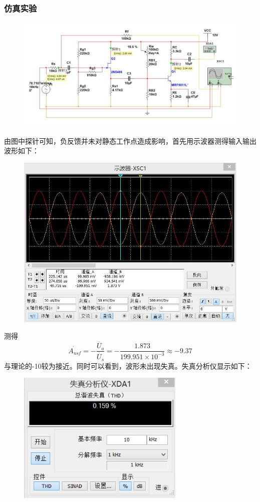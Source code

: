 \documentclass[12pt,a4paper]{article}
\begin{document}
\begin{spacing}{1.3}
\subsubsection{仿真实验}
\begin{figure}[H]
\centering
\includegraphics[width=\textwidth]{2.jpg}
\end{figure}
由图中探针可知，负反馈并未对静态工作点造成影响，首先用示波器测得输入输出波形如下：
\begin{figure}[H]
\centering
\includegraphics[width=\textwidth]{3.jpg}
\end{figure}
测得
\[
\dot{A_{usf}} = - \frac{\dot{U_o}}{\dot{U_s}} = - \frac{1.873}{199.951 \times 10^{-3}} \approx -9.37
\]
与理论的-10较为接近。同时可以看到，波形未出现失真。失真分析仪显示如下：
\begin{figure}[H]
\centering
\includegraphics[width=8cm]{5.jpg}

\end{figure}
\end{spacing}
\end{document}
